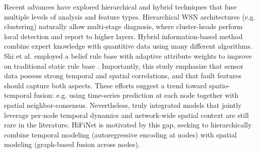 Recent advances have explored hierarchical and hybrid techniques that fuse multiple levels of analysis and feature types. Hierarchical WSN architectures (e.g. clustering) naturally allow multi-stage diagnosis, where cluster-heads perform local detection and report to higher layers. Hybrid information-based method combine expert knowledge with quantitive data using many different algorithms. Shi et al. employed a belief rule base with adaptive attribute weights to improve on traditional static rule base \cite{Shi2024}. Importantly, this study emphasize that sensor data possess strong temporal and spatial correlations, and that fault features should capture both aspects. These efforts suggest a trend toward spatio-temporal fusion: e.g. using time-series prediction at each node together with spatial neighbor-consensus. Nevertheless, truly integrated models that jointly leverage per-node temporal dynamics and network-wide spatial context are still rare in the literature. HiFiNet is motivated by this gap, seeking to hierarchically combine temporal modeling (autoregressive encoding at nodes) with spatial modeling (graph-based fusion across nodes).
